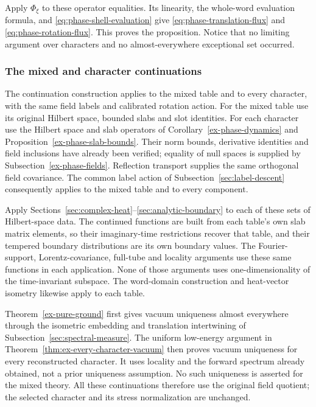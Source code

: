 Apply $\Phi_\xi$ to these operator equalities. Its linearity, the
whole-word evaluation formula, and \eqref{eq:phase-shell-evaluation}
give \eqref{eq:phase-translation-flux} and
\eqref{eq:phase-rotation-flux}. This proves the proposition. Notice
that no limiting argument over characters and no almost-everywhere
exceptional set occurred.

\subsubsection{The mixed and character continuations}

The continuation construction applies to the mixed table and to every
character, with the same field labels and calibrated rotation action. For the mixed table
use its original Hilbert space, bounded slabs and slot identities.
For each character use the Hilbert space and slab operators
of Corollary~\ref{ex-phase-dynamics} and
Proposition~\ref{ex-phase-slab-bounds}. Their norm bounds, derivative
identities and field inclusions have already been verified; equality
of null spaces is supplied by Subsection~\ref{ex-phase-fields}.
Reflection transport supplies the same orthogonal field covariance.
The common label action of Subsection~\ref{sec:label-descent} consequently
applies to the mixed table and to every component.

Apply Sections~\ref{sec:complex-heat}--\ref{sec:analytic-boundary}
to each of these sets of Hilbert-space data. The continued
functions are built from each table's own slab matrix elements, so
their imaginary-time restrictions recover that table, and their
tempered boundary distributions are its own boundary values. The
Fourier-support, Lorentz-covariance, full-tube and locality arguments
use these same functions in each application. None of those arguments
uses one-dimensionality of the time-invariant subspace. The word-domain
construction and heat-vector isometry likewise apply to each table.

Theorem~\ref{ex-pure-ground} first gives vacuum uniqueness almost
everywhere through the isometric embedding and translation intertwining
of Subsection~\ref{sec:spectral-measure}. The uniform low-energy argument
in Theorem~\ref{thm:ex-every-character-vacuum} then proves vacuum
uniqueness for every reconstructed character. It uses locality and the
forward spectrum already obtained, not a prior uniqueness assumption.
No such uniqueness is asserted for the mixed theory. All these
continuations therefore use the original field quotient; the selected
character and its stress normalization are unchanged.
